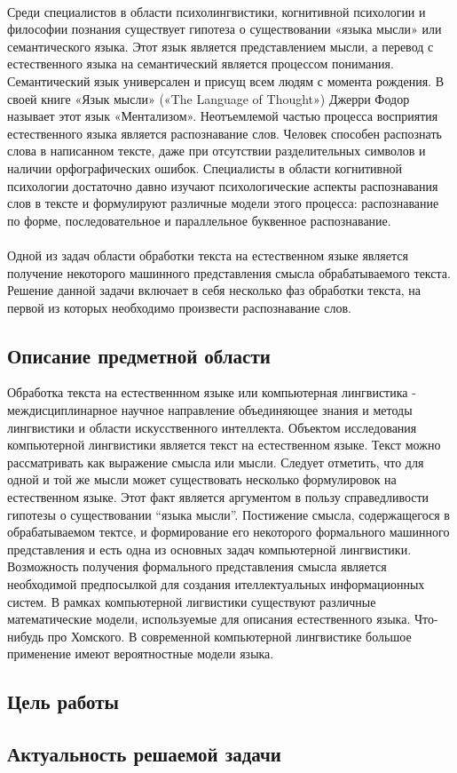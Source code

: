 \paragraph{}
Среди специалистов в области психолингвистики, когнитивной психологии и философии познания существует гипотеза о существовании  «языка мысли» или семантического языка. Этот язык является представлением мысли, а перевод с естественного языка на семантический является процессом понимания. Семантический язык универсален и присущ всем людям с момента рождения. В своей книге «Язык мысли» («The Language of Thought») Джерри Фодор называет этот язык «Ментализом». Неотъемлемой частью процесса восприятия естественного языка является распознавание слов. Человек способен распознать слова в написанном тексте, даже при отсутствии разделительных символов и наличии орфографических ошибок. Специалисты в области когнитивной психологии достаточно давно изучают психологические аспекты распознавания слов в тексте и формулируют различные модели этого процесса: распознавание по форме, последовательное и параллельное буквенное распознавание. 
\paragraph{}
Одной из задач области обработки текста на естественном языке является получение некоторого машинного представления смысла обрабатываемого текста. Решение данной задачи включает в себя несколько фаз обработки текста, на первой из которых необходимо произвести распознавание слов.

\newpage
\subsection{Описание предметной области}
Обработка текста на естественнном языке или компьютерная лингвистика - междисциплинарное научное направление объединяющее знания и методы лингвистики и области искусственного интеллекта. Объектом исследования компьютерной лингвистики является текст на естественном языке. Текст можно рассматривать как выражение смысла или мысли. Следует отметить, что для одной и той же мысли может существовать несколько формулировок на естественном языке. Этот факт является аргументом в пользу справедливости гипотезы о существовании “языка мысли”. Постижение смысла, содержащегося в обрабатываемом тектсе, и формирование его некоторого формального машинного представления и есть одна из основных задач компьютерной лингвистики. Возможность получения формального представления смысла является необходимой предпосылкой для создания ителлектуальных информационных систем. В рамках компьютерной лигвистики существуют различные математические модели, используемые для описания естественного языка. Что-нибудь про Хомского. В современной компьютерной лингвистике большое применение имеют вероятностные модели языка.

\subsection{Цель работы}

\subsection{Актуальность решаемой задачи}